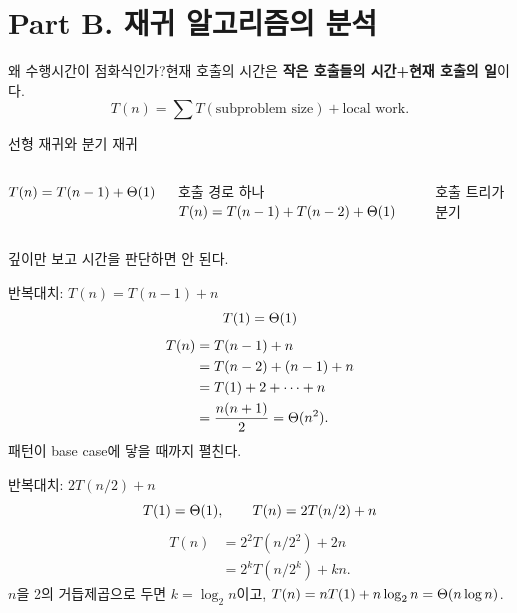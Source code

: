 \section{Part B. 재귀 알고리즘의 분석}
\begin{frame}{왜 수행시간이 점화식인가?}현재 호출의 시간은 \textbf{작은 호출들의 시간+현재 호출의 일}이다.\[T(n)=\sum T(\text{subproblem size})+\text{local work}.\]
\vfill{}
\end{frame}
\begin{frame}{선형 재귀와 분기 재귀}\begin{columns}[T]$T(n)=T(n-1)+\Theta(1)$\par 호출 경로 하나$T(n)=T(n-1)+T(n-2)+\Theta(1)$\par 호출 트리가 분기\end{columns}\vfill 깊이만 보고 시간을 판단하면 안 된다.
\end{frame}
\begin{frame}{반복대치: $T(n)=T(n-1)+n$}
\[
T(1)=\Theta(1)
\]
\Large
\begin{align*}
T(n)&=T(n-1)+n\\
&=T(n-2)+(n-1)+n\\
&=T(1)+2+\cdots+n\\
&=\frac{n(n+1)}2=\Theta(n^2).
\end{align*}
\normalsize 패턴이 base case에 닿을 때까지 펼친다.
\end{frame}
\begin{frame}{반복대치: $2T(n/2)+n$}
\[
T(1)=\Theta(1),\qquad T(n)=2T(n/2)+n
\]
\begin{align*}
T(n)&=2^2T(n/2^2)+2n\\
&=2^kT(n/2^k)+kn.
\end{align*}
$n$을 2의 거듭제곱으로 두면 $k=\log_2n$이고,
$T(n)=nT(1)+n\log_2n=\Theta(n\log n)$.
\vfill{}
\end{frame}
